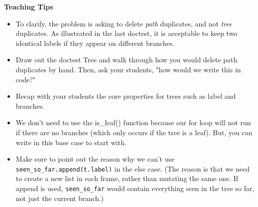 \begin{guide}
    \textbf{Teaching Tips}
    \begin{itemize}
       \item To clarify, the problem is asking to delete \textit{path} duplicates, and not \textit{tree} duplicates.
       As illustrated in the last doctest, it is acceptable to keep two identical labels if they appear on different branches. 
       \item Draw out the doctest Tree and walk through how you would delete path duplicates by hand. Then, ask your students, "how would we write this in code?"
       \item Recap with your students the core properties for trees such as label and branches.
       \item We don't need to use the is\_leaf() function because our for loop will not run if there are no branches (which only occurs if the tree is a leaf). But, you can write in this base case to start with.
       \item Make sure to point out the reason why we can't use \texttt{seen\_so\_far.append(t.label)} in the else case. 
       (The reason is that we need to create a new list in each frame, rather than mutating the same one. If append is used,
       \texttt{seen\_so\_far} would contain everything seen in the tree so far, not just the current branch.)
    \end{itemize}
 \end{guide}


